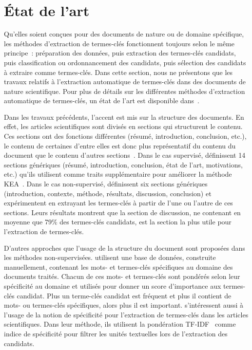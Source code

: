 \section{État de l'art}
\label{sec:etat_de_l_art}
  Qu'elles soient conçues pour des documents de nature ou de domaine spécifique,
  les méthodes d'extraction de termes-clés fonctionnent toujours selon le même
  principe~: préparation des données, puis extraction des termes-clés candidats,
  puis classification ou ordonnancement des candidats, puis sélection des
  candidats à extraire comme termes-clés. Dans cette section, nous ne présentons
  que les travaux relatifs à l'extraction automatique de termes-clés dans des
  documents de nature scientifique. Pour plus de détails sur les différentes
  méthodes d'extraction automatique de termes-clés, un état de l'art est
  disponible dans~\cite{bougouin2013stateoftheart}.

  Dans les travaux précédents, l'accent est mis sur la structure des documents.
  En effet, les articles scientifiques sont divisés en sections qui structurent
  le contenu. Ces sections ont des fonctions différentes (résumé, introduction,
  conclusion, etc.), le contenu de certaines d'entre elles est donc plus
  représentatif du contenu du document que le contenu d'autres
  sections~\cite{shah2003wherearethekeywords}. Dans le cas supervisé,
   définissent 14 sections génériques
  (résumé, introduction, conclusion, état de l'art, motivations, etc.) qu'ils
  utilisent comme traits supplémentaire pour améliorer la méthode
  KEA~\cite{witten1999kea}. Dans le cas non-supervisé,
   définissent six sections
  génériques (introduction, contexte, méthode, résultats, discussion,
  conclusion) et expérimentent en extrayant les termes-clés à partir de l'une ou
  l'autre de ces sections. Leurs résultats montrent que la section de
  discussion, ne contenant en moyenne que 79\% des termes-clés candidats, est la
  section la plus utile pour l'extraction de termes-clés.

  D'autres approches que l'usage de la structure du document sont proposées dans
  les méthodes non-supervisées.
   utilisent une base de
  données, construite manuellement, contenant les mots- et termes-clés
  spécifiques au domaine des documents traités. Chacun de ces mots- et
  termes-clés sont pondérés selon leur spécificité au domaine et utilisés pour
  donner un score d'importance aux termes-clés candidat. Plus un terme-clés
  candidat est fréquent et plus il contient de mots- ou termes-clés spécifiques,
  alors plus il est important.  s'intéressent
  aussi à l'usage de la notion de spécificité pour l'extraction de termes-clés
  dans les articles scientifiques. Dans leur méthode, ils utilisent la
  pondération TF-IDF~\cite{jones1972tfidf} comme indice de spécificité pour
  filtrer les unités textuelles lors de l'extraction des candidats.

